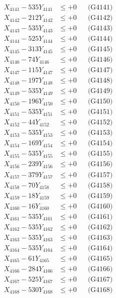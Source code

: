 \documentclass[a4paper,10pt]{article}
\begin{document}
{\begin{align}
\allowbreak
X_{4141} - 535Y_{4141} &\leq +0 && \text{(G4141)} \\
X_{4142} - 212Y_{4142} &\leq +0 && \text{(G4142)} \\
X_{4143} - 535Y_{4143} &\leq +0 && \text{(G4143)} \\
X_{4144} - 525Y_{4144} &\leq +0 && \text{(G4144)} \\
X_{4145} - 313Y_{4145} &\leq +0 && \text{(G4145)} \\
X_{4146} - 74Y_{4146} &\leq +0 && \text{(G4146)} \\
X_{4147} - 115Y_{4147} &\leq +0 && \text{(G4147)} \\
X_{4148} - 197Y_{4148} &\leq +0 && \text{(G4148)} \\
X_{4149} - 535Y_{4149} &\leq +0 && \text{(G4149)} \\
X_{4150} - 196Y_{4150} &\leq +0 && \text{(G4150)} \\
\allowbreak
X_{4151} - 535Y_{4151} &\leq +0 && \text{(G4151)} \\
X_{4152} - 44Y_{4152} &\leq +0 && \text{(G4152)} \\
X_{4153} - 535Y_{4153} &\leq +0 && \text{(G4153)} \\
X_{4154} - 169Y_{4154} &\leq +0 && \text{(G4154)} \\
X_{4155} - 535Y_{4155} &\leq +0 && \text{(G4155)} \\
X_{4156} - 239Y_{4156} &\leq +0 && \text{(G4156)} \\
X_{4157} - 379Y_{4157} &\leq +0 && \text{(G4157)} \\
X_{4158} - 70Y_{4158} &\leq +0 && \text{(G4158)} \\
X_{4159} - 18Y_{4159} &\leq +0 && \text{(G4159)} \\
X_{4160} - 16Y_{4160} &\leq +0 && \text{(G4160)} \\
\allowbreak
X_{4161} - 535Y_{4161} &\leq +0 && \text{(G4161)} \\
X_{4162} - 535Y_{4162} &\leq +0 && \text{(G4162)} \\
X_{4163} - 535Y_{4163} &\leq +0 && \text{(G4163)} \\
X_{4164} - 535Y_{4164} &\leq +0 && \text{(G4164)} \\
X_{4165} - 61Y_{4165} &\leq +0 && \text{(G4165)} \\
X_{4166} - 284Y_{4166} &\leq +0 && \text{(G4166)} \\
X_{4167} - 525Y_{4167} &\leq +0 && \text{(G4167)} \\
X_{4168} - 530Y_{4168} &\leq +0 && \text{(G4168)} \\

\end{align}}
\end{document}
